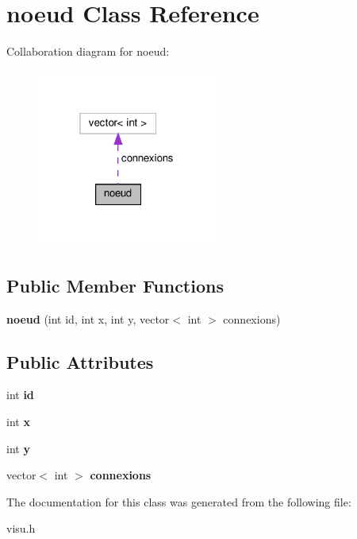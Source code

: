 \hypertarget{classnoeud}{}\section{noeud Class Reference}
\label{classnoeud}


Collaboration diagram for noeud\+:
\nopagebreak
\begin{figure}[H]
\begin{center}
\leavevmode
\includegraphics[width=169pt]{classnoeud__coll__graph}
\end{center}
\end{figure}
\subsection*{Public Member Functions}
\begin{DoxyCompactItemize}
\item 
\mbox{\label{classnoeud_a1fceeeadf0a50a0e939547f4cd9bd204}} 
{\bfseries noeud} (int id, int x, int y, vector$<$ int $>$ connexions)
\end{DoxyCompactItemize}
\subsection*{Public Attributes}
\begin{DoxyCompactItemize}
\item 
\mbox{\label{classnoeud_afe9e88272d7aba8cf7462046a97be26a}} 
int {\bfseries id}
\item 
\mbox{\label{classnoeud_a08c566e34f51ca6d6e3c8f20f6318a8e}} 
int {\bfseries x}
\item 
\mbox{\label{classnoeud_a85bdb2c0ee612f23d28e5e5c2c62cb67}} 
int {\bfseries y}
\item 
\mbox{\label{classnoeud_a424c782cc730a5200c2783e64a7aa6e1}} 
vector$<$ int $>$ {\bfseries connexions}
\end{DoxyCompactItemize}


The documentation for this class was generated from the following file\+:\begin{DoxyCompactItemize}
\item 
visu.\+h\end{DoxyCompactItemize}
